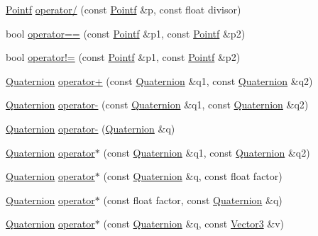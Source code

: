 \begin{DoxyCompactItemize}
\item 
\hyperlink{classprism_1_1_pointf}{Pointf} \hyperlink{namespaceprism_a71504f6dd299e8bc788e07d11d29dc5e}{operator/} (const \hyperlink{classprism_1_1_pointf}{Pointf} \&p, const float divisor)
\item 
bool \hyperlink{namespaceprism_a13ab889958edc08eea9a5bea056cd9c1}{operator==} (const \hyperlink{classprism_1_1_pointf}{Pointf} \&p1, const \hyperlink{classprism_1_1_pointf}{Pointf} \&p2)
\item 
bool \hyperlink{namespaceprism_ae010d5880eb7bcf5119f006e26bf473f}{operator!=} (const \hyperlink{classprism_1_1_pointf}{Pointf} \&p1, const \hyperlink{classprism_1_1_pointf}{Pointf} \&p2)
\item 
\hyperlink{classprism_1_1_quaternion}{Quaternion} \hyperlink{namespaceprism_ad81bceaddc25922e571b4bf427ffe296}{operator+} (const \hyperlink{classprism_1_1_quaternion}{Quaternion} \&q1, const \hyperlink{classprism_1_1_quaternion}{Quaternion} \&q2)
\item 
\hyperlink{classprism_1_1_quaternion}{Quaternion} \hyperlink{namespaceprism_a5eae37b5dc73c544572686f215cea89d}{operator-\/} (const \hyperlink{classprism_1_1_quaternion}{Quaternion} \&q1, const \hyperlink{classprism_1_1_quaternion}{Quaternion} \&q2)
\item 
\hyperlink{classprism_1_1_quaternion}{Quaternion} \hyperlink{namespaceprism_ae04c2e5eae2242c58a967086ecad8ff4}{operator-\/} (\hyperlink{classprism_1_1_quaternion}{Quaternion} \&q)
\item 
\hyperlink{classprism_1_1_quaternion}{Quaternion} \hyperlink{namespaceprism_a74c3eeec91c3a178711b6f05a5487d70}{operator$\ast$} (const \hyperlink{classprism_1_1_quaternion}{Quaternion} \&q1, const \hyperlink{classprism_1_1_quaternion}{Quaternion} \&q2)
\item 
\hyperlink{classprism_1_1_quaternion}{Quaternion} \hyperlink{namespaceprism_a45806b1a58ec5aae0db87d399d4d832b}{operator$\ast$} (const \hyperlink{classprism_1_1_quaternion}{Quaternion} \&q, const float factor)
\item 
\hyperlink{classprism_1_1_quaternion}{Quaternion} \hyperlink{namespaceprism_ad9f03413053b1efa6851344eb39a5982}{operator$\ast$} (const float factor, const \hyperlink{classprism_1_1_quaternion}{Quaternion} \&q)
\item 
\hyperlink{classprism_1_1_quaternion}{Quaternion} \hyperlink{namespaceprism_a8aebd3615ba448915f37140515a37b05}{operator$\ast$} (const \hyperlink{classprism_1_1_quaternion}{Quaternion} \&q, const \hyperlink{classprism_1_1_vector3}{Vector3} \&v)

\end{DoxyCompactItemize}
